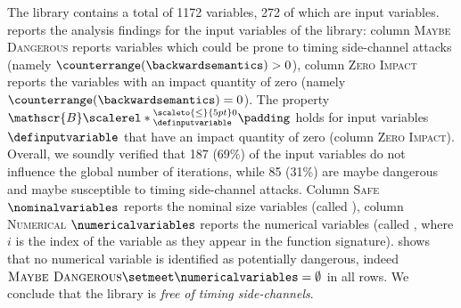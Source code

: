 %
The library contains a total of 1172 variables, 272 of which are input variables.
 reports the analysis findings for the input variables of the \bignum{} library: column \textsc{Maybe Dangerous} reports variables which could be prone to timing side-channel attacks (namely $\counterrange(\backwardsemantics) > 0$),
column \textsc{Zero Impact} reports the variables with an impact quantity of zero (namely $\counterrange(\backwardsemantics) = 0$).
The property $\mathscr{B}\scalerel*{\vphantom{}^{{\scaleto{\le}{5pt}0}}_{\definputvariable}}{\padding}$ holds for input variables $\definputvariable$ that have an impact quantity of zero (column \textsc{Zero Impact}).
Overall, we soundly verified that 187 (69\%) of the input variables do not influence the global number of iterations, while 85 (31\%) are maybe dangerous and maybe susceptible to timing side-channel attacks.
%
Column \textsc{Safe} $\nominalvariables$ reports the nominal size variables (called ), column \textsc{Numerical} $\numericalvariables$ reports the numerical variables (called , where $i$ is the index of the variable as they appear in the function signature).
 shows that no numerical variable is identified as potentially dangerous, indeed $\textsc{Maybe Dangerous} \setmeet \numericalvariables = \emptyset$ in all rows.
We conclude that the \bignum{} library is \emph{free of timing side-channels}.


%


% 


